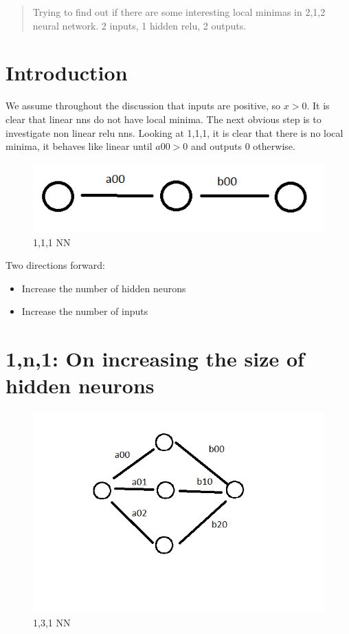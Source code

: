 \documentclass[conference]{IEEEtran}
\begin{document}
\begin{abstract}
Trying to find out if there are some interesting local minimas in 2,1,2 neural network. 2 inputs, 1 hidden relu, 2 outputs.
\end{abstract}

\IEEEpeerreviewmaketitle

\section{Introduction}
We assume throughout the discussion that inputs are positive, so $x > 0$.
It is clear that linear nns do not have local minima. The next obvious step is to investigate non linear relu nns.
Looking at 1,1,1, it is clear that there is no local minima, it behaves like linear until $a00 > 0$ and outputs $0$ otherwise.

\begin{figure}
	\includegraphics[width=\linewidth]{images/nn/111.png}
	\caption{1,1,1 NN}
	\label{fig:111}
\end{figure}

Two directions forward:
\begin{itemize}
	\item Increase the number of hidden neurons
	\item Increase the number of inputs
\end{itemize}

\section{1,n,1: On increasing the size of hidden neurons} 

\begin{figure}
	\includegraphics[width=\linewidth]{images/nn/131.png}
	\caption{1,3,1 NN}
	\label{fig:131}
\end{figure}
\end{document}
